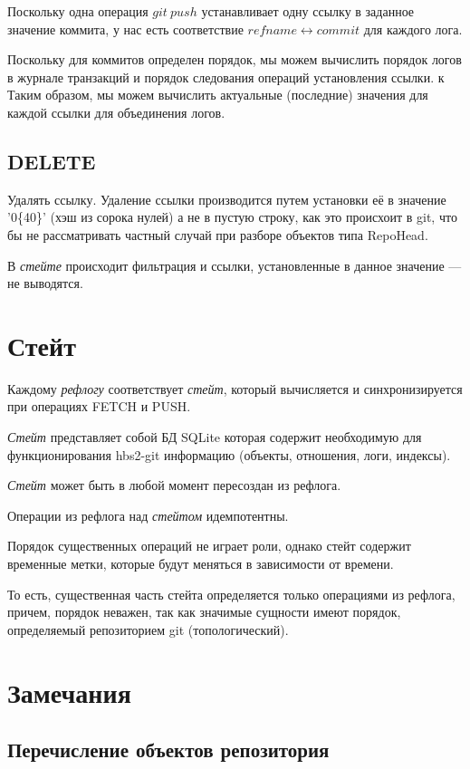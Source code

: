 \documentclass[11pt,a4paper]{article}
\newcommand{\term}[2]{\textit{#2}}
\begin{document}
Поскольку одна операция $git~push$ устанавливает одну ссылку в заданное значение коммита,
у нас есть соответствие $refname \leftrightarrow commit$ для каждого лога.

Поскольку для коммитов определен порядок, мы можем вычислить порядок логов в журнале транзакций
и порядок следования операций установления ссылки.
к
Таким образом, мы можем вычислить актуальные (последние) значения для каждой ссылки для
объединения логов.

\subsection{DELETE}

Удалять ссылку. Удаление ссылки производится путем установки её в значение
'0\{40\}' (хэш из сорока нулей) а не в пустую строку, как это происхоит в git,
что бы не рассматривать частный случай при разборе объектов типа RepoHead.

В \term{state}{стейте} происходит фильтрация и ссылки, установленные в
данное значение --- не выводятся.

\section{Стейт}

Каждому \term{reflog}{рефлогу} соответствует  \term{state}{стейт}, который вычисляется и
синхронизируется при операциях FETCH и PUSH.

\term{state}{Стейт} представляет собой БД SQLite которая содержит необходимую для функционирования
hbs2-git информацию (объекты, отношения, логи, индексы).

\term{state}{Стейт} может быть в любой момент пересоздан из рефлога.

Операции из рефлога над \term{state}{стейтом} идемпотентны.

Порядок существенных операций не играет роли, однако стейт содержит временные метки,
которые будут меняться в зависимости от времени.

То есть, существенная часть стейта определяется только операциями из рефлога, причем,
порядок неважен, так как значимые сущности имеют порядок, определяемый репозиторием git
(топологический).

\section{Замечания}

\subsection*{Перечисление объектов репозитория}
\end{document}
